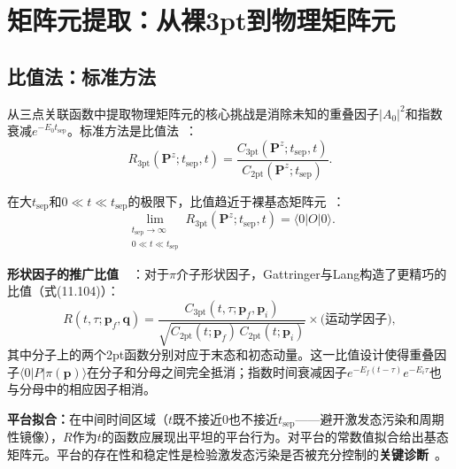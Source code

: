 \documentclass[12pt,a4paper]{ctexart}
\theoremstyle{definition}
\begin{document}
\section{矩阵元提取：从裸3pt到物理矩阵元}

\subsection{比值法：标准方法}

从三点关联函数中提取物理矩阵元的核心挑战是消除未知的重叠因子$|A_0|^2$和指数衰减$e^{-E_0 t_{\text{sep}}}$。标准方法是比值法~\cite{GattringerLang2010,correlationFunctions2026,gluonQuasiOpReport2026}：
\begin{equation}\label{eq:ratio_method}
    R_{3\text{pt}}(\mathbf{P}^z; t_{\text{sep}}, t) =
    \frac{C_{3\text{pt}}(\mathbf{P}^z; t_{\text{sep}}, t)}{C_{2\text{pt}}(\mathbf{P}^z; t_{\text{sep}})}.
\end{equation}

在大$t_{\text{sep}}$和$0 \ll t \ll t_{\text{sep}}$的极限下，比值趋近于裸基态矩阵元~\cite{correlationFunctions2026}：
\begin{equation}\label{eq:ratio_limit}
    \lim_{\substack{t_{\text{sep}} \to \infty \\ 0 \ll t \ll t_{\text{sep}}}}
    R_{3\text{pt}}(\mathbf{P}^z; t_{\text{sep}}, t) = \langle 0|O|0\rangle.
\end{equation}

\textbf{形状因子的推广比值~}~\cite{GattringerLang2010,formFactors2026}：对于$\pi$介子形状因子，Gattringer与Lang构造了更精巧的比值（式(11.104)）：
\begin{equation}\label{eq:ff_ratio}
    R(t,\tau; \mathbf{p}_f, \mathbf{q}) =
    \frac{C_{3\text{pt}}(t,\tau; \mathbf{p}_f, \mathbf{p}_i)}
    {\sqrt{C_{2\text{pt}}(t; \mathbf{p}_f)\,C_{2\text{pt}}(t; \mathbf{p}_i)}} \times \text{(运动学因子)},
\end{equation}
其中分子上的两个2pt函数分别对应于末态和初态动量。这一比值设计使得重叠因子$\langle 0|P|\pi(\mathbf{p})\rangle$在分子和分母之间完全抵消；指数时间衰减因子$e^{-E_f(t-\tau)}e^{-E_i\tau}$也与分母中的相应因子相消。

\textbf{平台拟合：}在中间时间区域（$t$既不接近0也不接近$t_{\text{sep}}$——避开激发态污染和周期性镜像），$R$作为$t$的函数应展现出平坦的平台行为。对平台的常数值拟合给出基态矩阵元。平台的存在性和稳定性是检验激发态污染是否被充分控制的\textbf{关键诊断}~\cite{correlationFunctions2026,formFactors2026}。
\end{document}

